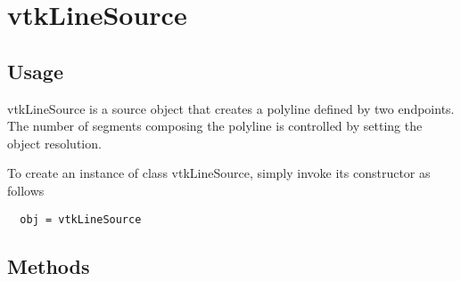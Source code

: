 \section{vtkLineSource}

\subsection{Usage}

 vtkLineSource is a source object that creates a polyline defined by
 two endpoints. The number of segments composing the polyline is
 controlled by setting the object resolution.

To create an instance of class vtkLineSource, simply
invoke its constructor as follows
\begin{verbatim}
  obj = vtkLineSource
\end{verbatim}
\subsection{Methods}

